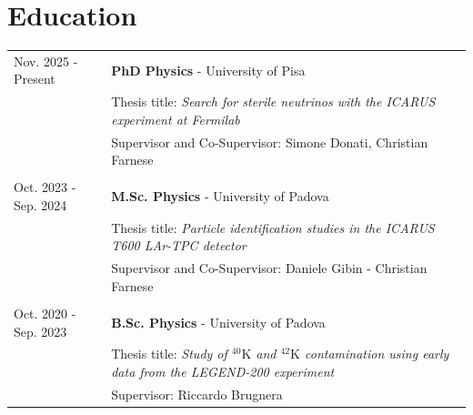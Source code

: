 \documentclass[a4paper,12pt]{article}
\begin{document}
\section{Education}
\begin{tabularx}{\linewidth}{@{}l X@{}}	

Nov. 2025 - Present & \textbf{PhD Physics} - University of Pisa \\
& Thesis title: \textit{Search for sterile neutrinos with the ICARUS experiment at Fermilab}\\
& Supervisor and Co-Supervisor: Simone Donati, Christian Farnese \\\\

Oct. 2023 - Sep. 2024 & \textbf{M.Sc. Physics} - University of Padova \\
& Thesis title: \textit{Particle identification studies in the ICARUS T600 LAr-TPC detector} \\
& Supervisor and Co-Supervisor: Daniele Gibin - Christian Farnese \\\\

Oct. 2020 - Sep. 2023 & \textbf{B.Sc. Physics} - University of Padova \\
& Thesis title: \textit{Study of $^{40}\text{K}$ and $^{42}\text{K}$ contamination using early data from the LEGEND-200 experiment} \\
& Supervisor: Riccardo Brugnera


\end{tabularx}




\end{document}
